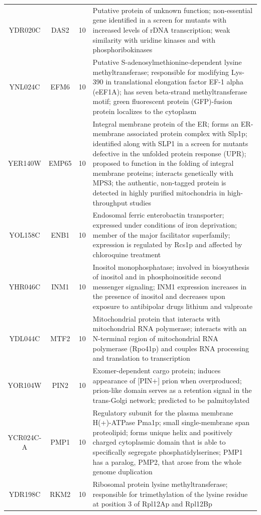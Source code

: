 \documentclass[]{article}
\begin{document}
\begin{longtable}{@{\extracolsep{3pt}} cccp{85mm}}
		YDR020C & DAS2 & 10 & Putative protein of unknown function; non-essential gene identified in a screen for mutants with increased levels of rDNA transcription; weak similarity with uridine kinases and with phosphoribokinases \\ 
		YNL024C & EFM6 & 10 & Putative S-adenosylmethionine-dependent lysine methyltransferase; responsible for modifying Lys-390 in translational elongation factor EF-1 alpha (eEF1A); has seven beta-strand methyltransferase motif; green fluorescent protein (GFP)-fusion protein localizes to the cytoplasm \\ 
		YER140W & EMP65 & 10 & Integral membrane protein of the ER; forms an ER-membrane associated protein complex with Slp1p; identified along with SLP1 in a screen for mutants defective in the unfolded protein response (UPR); proposed to function in the folding of integral membrane proteins; interacts genetically with MPS3; the authentic, non-tagged protein is detected in highly purified mitochondria in high-throughput studies \\ 
		YOL158C & ENB1 & 10 & Endosomal ferric enterobactin transporter; expressed under conditions of iron deprivation; member of the major facilitator superfamily; expression is regulated by Rcs1p and affected by chloroquine treatment \\ 
		YHR046C & INM1 & 10 & Inositol monophosphatase; involved in biosynthesis of inositol and in phosphoinositide second messenger signaling; INM1 expression increases in the presence of inositol and decreases upon exposure to antibipolar drugs lithium and valproate \\ 
		YDL044C & MTF2 & 10 & Mitochondrial protein that interacts with mitochondrial RNA polymerase; interacts with an N-terminal region of mitochondrial RNA polymerase (Rpo41p) and couples RNA processing and translation to transcription \\ 
		YOR104W & PIN2 & 10 & Exomer-dependent cargo protein; induces appearance of [PIN+] prion when overproduced; prion-like domain serves as a retention signal in the trans-Golgi network; predicted to be palmitoylated \\ 
		YCR024C-A & PMP1 & 10 & Regulatory subunit for the plasma membrane H(+)-ATPase Pma1p; small single-membrane span proteolipid; forms unique helix and positively charged cytoplasmic domain that is able to specifically segregate phosphatidylserines; PMP1 has a paralog, PMP2, that arose from the whole genome duplication \\ 
		YDR198C & RKM2 & 10 & Ribosomal protein lysine methyltransferase; responsible for trimethylation of the lysine residue at position 3 of Rpl12Ap and Rpl12Bp \\ 

\end{longtable}
\end{document}
